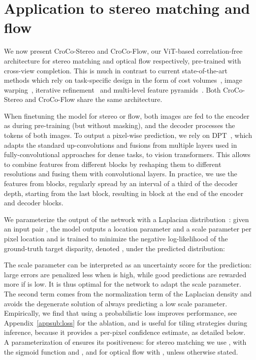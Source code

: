 \documentclass[10pt,twocolumn,letterpaper]{article}
\newcommand{\PAR}[1]{\noindent{\bf{#1.}}}
\newcommand{\ours}{CroCo-Stereo\xspace}
\newcommand{\oursflow}{CroCo-Flow\xspace}
\begin{document}
\section{Application to stereo matching and flow}
\label{sec:stereo}

We now present \ours and \oursflow, our ViT-based correlation-free architecture for stereo matching and optical flow respectively, pre-trained with cross-view completion.
This is much in contrast to current state-of-the-art methods which rely on task-specific design in the form of cost volumes~\cite{flowformer,jie2018left,gcnet,stereonet,adastereo,pwcnetplus,acvnet,yin2019hierarchical,dip}, image warping~\cite{brox2004high,pwcnetplus}, iterative refinement~\cite{crestereo,raftstereo} and multi-level feature pyramids~\cite{leastereo,crestereo,pwcnetplus,hitnet}. Both \ours and \oursflow share the same architecture.

\PAR{Architecture} When finetuning the model for stereo or flow, both images are fed to the encoder as during pre-training (but without masking), and the decoder processes the tokens of both images.
To output a pixel-wise prediction, we rely on DPT~\cite{dpt}, which adapts the standard up-convolutions and fusions from multiple layers 
used in fully-convolutional approaches for dense tasks, to vision transformers.
This allows to combine features from different blocks by reshaping them to different resolutions and fusing them with convolutional layers. 
In practice, we use the features from  blocks, regularly spread by an interval of a third of the decoder depth, starting from the last block, resulting in  block at the end of the encoder and  decoder blocks.

\PAR{Loss} 
We parameterize the output of the network with a Laplacian distribution~\cite{laplacian}: given an input pair , the model outputs a location parameter  and a scale parameter  per pixel location  and is trained to minimize the negative log-likelihood of the ground-truth target disparity, denoted , under the predicted distribution:

The scale parameter  can be interpreted as an uncertainty score for the prediction: large errors are penalized less when  is high, while good predictions are rewarded more if  is low. 
It is thus optimal for the network to adapt the scale parameter. 
The second term comes from the normalization term of the Laplacian density and avoids the degenerate solution of always predicting a low scale parameter.
Empirically, we find that using a probabilistic loss improves performance, see Appendix~\ref{appsub:loss} for the ablation, and is useful for tiling strategies during inference, because it provides a per-pixel confidence estimate, as detailed below.
A parameterization of  ensures its positiveness: for stereo matching we use , with  the sigmoid function and , and for optical flow  with , unless otherwise stated.
\end{document}
